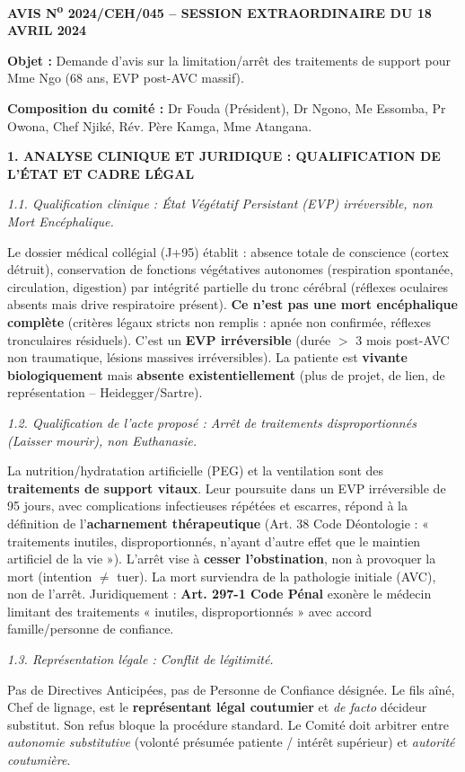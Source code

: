 \documentclass[11pt]{article}
\newcommand{\cle}[1]{{\popxbold\color{popdark}#1}}
\newcounter{popsec}
\newcounter{popsub}
\newcommand{\courssub}[1]{%
  \stepcounter{popsub}%
  \par\vspace{9pt}\noindent{\popxbold\fontsize{11.5}{13}\selectfont\color{popink}{\color{poporange}\thepopsec.\thepopsub}\hspace{6pt}#1}\par\nopagebreak\vspace{4pt}
}
\begin{document}
\courssub{Démarche et corrigé commenté}
\begin{exoresolu}
\textbf{AVIS N\textsuperscript{o} 2024/CEH/045 – SESSION EXTRAORDINAIRE DU 18 AVRIL 2024}\par
\textbf{Objet :} Demande d'avis sur la limitation/arrêt des traitements de support pour Mme Ngo (68 ans, EVP post-AVC massif).\par
\textbf{Composition du comité :} Dr Fouda (Président), Dr Ngono, Me Essomba, Pr Owona, Chef Njiké, Rév. Père Kamga, Mme Atangana.\par
\vspace{0.5cm}

\noindent\textbf{1. ANALYSE CLINIQUE ET JURIDIQUE : QUALIFICATION DE L'ÉTAT ET CADRE LÉGAL}\par
\emph{1.1. Qualification clinique : État Végétatif Persistant (EVP) irréversible, non Mort Encéphalique.}\par
Le dossier médical collégial (J+95) établit : absence totale de conscience (cortex détruit), conservation de fonctions végétatives autonomes (respiration spontanée, circulation, digestion) par intégrité partielle du tronc cérébral (réflexes oculaires absents mais drive respiratoire présent). \textbf{Ce n'est pas une mort encéphalique complète} (critères légaux stricts non remplis : apnée non confirmée, réflexes tronculaires résiduels). C'est un \textbf{EVP irréversible} (durée $>$ 3 mois post-AVC non traumatique, lésions massives irréversibles). La patiente est \textbf{vivante biologiquement} mais \textbf{absente existentiellement} (plus de \cle{projet}, de \cle{lien}, de \cle{représentation} – Heidegger/Sartre).\par
\emph{1.2. Qualification de l'acte proposé : Arrêt de traitements disproportionnés (Laisser mourir), non Euthanasie.}\par
La nutrition/hydratation artificielle (PEG) et la ventilation sont des \textbf{traitements de support vitaux}. Leur poursuite dans un EVP irréversible de 95 jours, avec complications infectieuses répétées et escarres, répond à la définition de l'\textbf{acharnement thérapeutique} (Art. 38 Code Déontologie : « traitements inutiles, disproportionnés, n'ayant d'autre effet que le maintien artificiel de la vie »). L'arrêt vise à \textbf{cesser l'obstination}, non à provoquer la mort (intention $\neq$ tuer). La mort surviendra de la pathologie initiale (AVC), non de l'arrêt. Juridiquement : \textbf{Art. 297-1 Code Pénal} exonère le médecin limitant des traitements « inutiles, disproportionnés » avec accord famille/personne de confiance.\par
\emph{1.3. Représentation légale : Conflit de légitimité.}\par
Pas de Directives Anticipées, pas de Personne de Confiance désignée. Le fils aîné, Chef de lignage, est le \textbf{représentant légal coutumier} et \emph{de facto} décideur substitut. Son refus bloque la procédure standard. Le Comité doit arbitrer entre \emph{autonomie substitutive} (volonté présumée patiente / intérêt supérieur) et \emph{autorité coutumière}.\par
\vspace{0.3cm}


\end{exoresolu}
\end{document}
